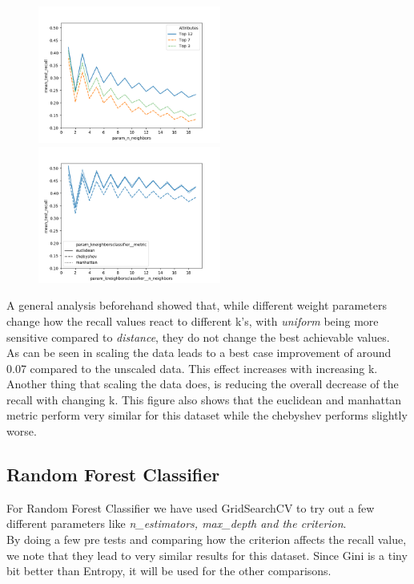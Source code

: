 \begin{figure}
\begin{floatrow}
    {\includegraphics[width=6cm]{plots/knn_wo_preprocessing.png}\label{fig:knn_wo_pre}}
    {\includegraphics[width=6cm]{plots/knn_uniform_metric_comparison.png}\label{fig:knn_w_pre}}
\end{floatrow}
\end{figure}
A general analysis beforehand showed that, while different weight parameters change how the recall values react to different k's, with \textit{uniform} being more sensitive compared to  \textit{distance}, they do not change the best achievable values.\\
\newline
As can be seen in  scaling the data leads to a best case improvement of around 0.07 compared to the unscaled data. This effect increases with increasing k. Another thing that scaling the data does, is reducing the overall decrease of the recall with changing k. This figure also shows that the euclidean and manhattan metric perform very similar for this dataset while the chebyshev performs slightly worse. 

\subsection{Random Forest Classifier}
For Random Forest Classifier we have used GridSearchCV to try out a few different parameters like \textit{n\_estimators, max\_depth and the criterion}. \\
\newline
By doing a few pre tests and comparing how the criterion affects the recall value, we note that they lead to very similar results for this dataset. Since Gini is a tiny bit better than Entropy, it will be used for the other comparisons. \\
\newline

